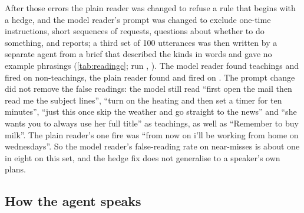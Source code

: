 After those errors the plain reader was changed to refuse a rule that begins with a hedge, and the model reader's prompt was changed to exclude one-time instructions, short sequences of requests, questions about whether to do something, and reports; a third set of 100 utterances was then written by a separate agent from a brief that described the kinds in words and gave no example phrasings (\cref{tab:readingc}; run , ).
The model reader found \ReadCModelFound{} teachings and fired on \ReadCModelFired{} non-teachings, the plain reader found \ReadCPlainFound{} and fired on \ReadCPlainFired{}. The prompt change did not remove the false readings: the model still read ``first open the mail then read me the subject lines'', ``turn on the heating and then set a timer for ten minutes'', ``just this once skip the weather and go straight to the news'' and ``she wants you to always use her full title'' as teachings, as well as ``Remember to buy milk''.
The plain reader's one fire was ``from now on i'll be working from home on wednesdays''. So the model reader's false-reading rate on near-misses is about one in eight on this set, and the hedge fix does not generalise to a speaker's own plans.

\begin{table}[t]
\centering\small

\caption{Readers of what a user says, on the test split of the authored utterances. ``Misread'' is a reading of a teaching with the wrong kind or without its key content.}
\label{tab:reading}
\end{table}

\begin{table}[t]
\centering\small

\caption{The same readers on the independently written utterances.}
\label{tab:readingb}
\end{table}

\begin{table}[t]
\centering\small

\caption{The revised readers on a third independently written set.}
\label{tab:readingc}
\end{table}

\subsection{How the agent speaks}

